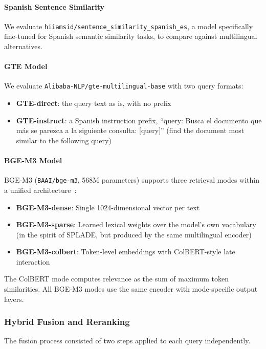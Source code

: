 \documentclass[preprint,review,12pt]{elsarticle}
\begin{document}
\paragraph{Spanish Sentence Similarity}
We evaluate \texttt{hiiamsid/\allowbreak sentence\_similarity\_spanish\_es}, a model specifically fine-tuned for Spanish semantic similarity tasks, to compare against multilingual alternatives.

\paragraph{GTE Model}
We evaluate \texttt{Alibaba-NLP/gte-multilingual-base} with two query formats:
\begin{itemize}
    \item \textbf{GTE-direct}: the query text as is, with no prefix
    \item \textbf{GTE-instruct}: a Spanish instruction prefix, ``query: Busca el documento que más se parezca a la siguiente consulta: [query]'' (find the document most similar to the following query)
\end{itemize}

\paragraph{BGE-M3 Model}
BGE-M3 (\texttt{BAAI/bge-m3}, 568M parameters) supports three retrieval modes within a unified architecture~\citep{chen2024bge}:
\begin{itemize}
    \item \textbf{BGE-M3-dense}: Single 1024-dimensional vector per text
    \item \textbf{BGE-M3-sparse}: Learned lexical weights over the model's own vocabulary (in the spirit of SPLADE, but produced by the same multilingual encoder)
    \item \textbf{BGE-M3-colbert}: Token-level embeddings with ColBERT-style late interaction
\end{itemize}
The ColBERT mode computes relevance as the sum of maximum token similarities. All BGE-M3 modes use the same encoder with mode-specific output layers.

\subsubsection{Hybrid Fusion and Reranking}
\label{subsec:hybrid_fusion}

The fusion process consisted of two steps applied to each query independently.
\end{document}
